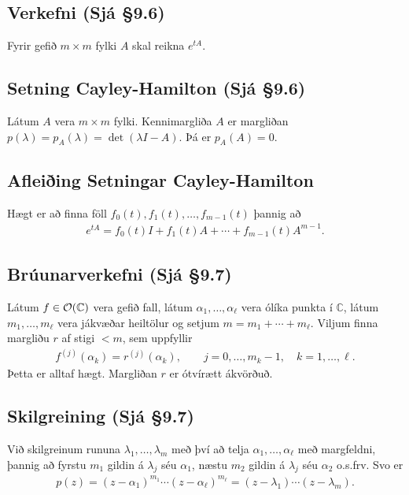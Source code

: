 \documentclass[a4paper,10pt,icelandic]{sphinxmanual}
\begin{document}
\subsection{Verkefni (Sjá \S{}9.6)}
\label{\detokenize{Kafli09:verkefni-sja-9-6}}
Fyrir gefið \(m\times m\) fylki \(A\) skal reikna \(e^{tA}\).


\subsection{Setning Cayley-Hamilton (Sjá \S{}9.6)}
\label{\detokenize{Kafli09:setning-cayley-hamilton-sja-9-6}}
Látum \(A\) vera \(m\times m\) fylki. Kennimargliða \(A\) er margliðan \(p(\lambda)=p_A(\lambda)=\det(\lambda I-A)\). Þá er \(p_A(A)=0\).


\subsection{Afleiðing Setningar Cayley-Hamilton}
\label{\detokenize{Kafli09:afleiing-setningar-cayley-hamilton}}
Hægt er að finna föll \(f_0(t), f_1(t), \ldots, f_{m-1}(t)\) þannig að
\begin{equation*}
\begin{split}e^{tA}= f_0(t)I+f_1(t)A+\cdots+f_{m-1}(t)A^{m-1}.\end{split}
\end{equation*}

\subsection{Brúunarverkefni (Sjá \S{}9.7)}
\label{\detokenize{Kafli09:bruunarverkefni-sja-9-7}}
Látum \(f\in {\cal O}({\mathbb{C}})\) vera gefið fall, látum \(\alpha_1,\dots,\alpha_\ell\) vera ólíka punkta í \({\mathbb{C}}\), látum \(m_1,\dots,m_\ell\) vera jákvæðar heiltölur og setjum \(m=m_1+\cdots+m_\ell\). Viljum finna margliðu \(r\) af stigi \(<m\), sem uppfyllir
\begin{equation*}
\begin{split}f^{(j)}(\alpha_k) = r^{(j)}(\alpha_k), \qquad
 j=0,\dots,m_k-1, \quad
k=1,\dots, \ell.\end{split}
\end{equation*}
Þetta er alltaf hægt. Margliðan \(r\) er ótvírætt ákvörðuð.


\subsection{Skilgreining (Sjá \S{}9.7)}
\label{\detokenize{Kafli09:skilgreining-sja-9-7}}
Við skilgreinum rununa \(\lambda_1,\dots,\lambda_m\) með því að telja \(\alpha_1,\dots,\alpha_\ell\) með margfeldni, þannig að fyrstu \(m_1\) gildin á \(\lambda_j\) séu \(\alpha_1\), næstu \(m_2\) gildin á \(\lambda_j\) séu \(\alpha_2\) o.s.frv. Svo er
\begin{equation*}
\begin{split}p(z)=(z-\alpha_1)^{m_1}\cdots(z-\alpha_\ell)^{m_\ell}
=(z-\lambda_1)\cdots(z-\lambda_m).\end{split}
\end{equation*}
\end{document}
